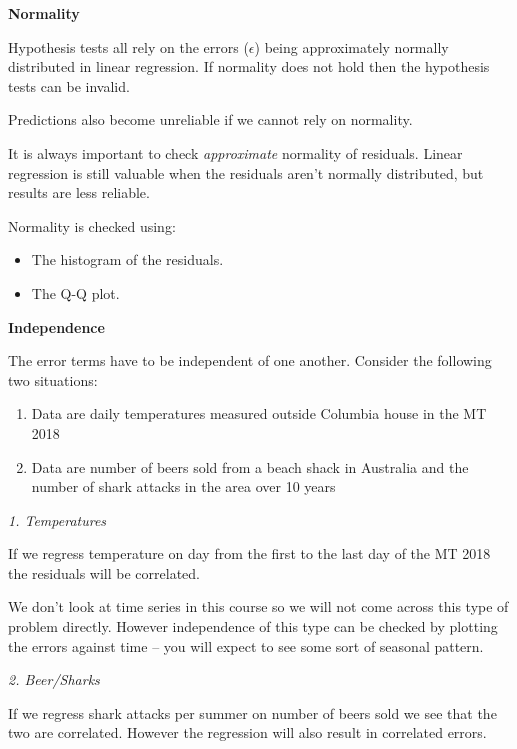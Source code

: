 \documentclass[
]{gitbook}
\providecommand{\tightlist}{%
  \setlength{\itemsep}{0pt}\setlength{\parskip}{0pt}}
\begin{document}
\textbf{Normality}

Hypothesis tests all rely on the errors (\(\epsilon\)) being approximately normally distributed in linear regression. If normality does not hold then the hypothesis tests can be invalid.

Predictions also become unreliable if we cannot rely on normality.

It is always important to check \emph{approximate} normality of residuals. Linear regression is still valuable when the residuals aren't normally distributed, but results are less reliable.

Normality is checked using:

\begin{itemize}
\tightlist
\item
  The histogram of the residuals.
\item
  The Q-Q plot.
\end{itemize}

\textbf{Independence}

The error terms have to be independent of one another. Consider the following two situations:

\begin{enumerate}
\def\labelenumi{\arabic{enumi}.}
\tightlist
\item
  Data are daily temperatures measured outside Columbia house in the MT 2018
\item
  Data are number of beers sold from a beach shack in Australia and the number of shark attacks in the area over 10 years
\end{enumerate}

\emph{1. Temperatures}

If we regress temperature on day from the first to the last day of the MT 2018 the residuals will be correlated.


We don't look at time series in this course so we will not come across this type of problem directly. However independence of this type can be checked by plotting the errors against time -- you will expect to see some sort of seasonal pattern.

\emph{2. Beer/Sharks}

If we regress shark attacks per summer on number of beers sold we see that the two are correlated. However the regression will also result in correlated errors.
\end{document}
